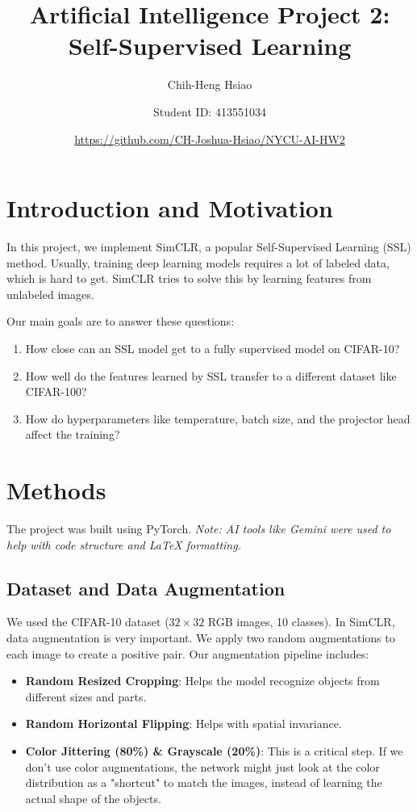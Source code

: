 \documentclass[12pt]{article}
\title{Artificial Intelligence Project 2: Self-Supervised Learning}
\author{Chih-Heng Hsiao \and Student ID: 413551034}
\date{\url{https://github.com/CH-Joshua-Hsiao/NYCU-AI-HW2}}
\begin{document}
\maketitle

\section{Introduction and Motivation}
In this project, we implement SimCLR, a popular Self-Supervised Learning (SSL) method. Usually, training deep learning models requires a lot of labeled data, which is hard to get. SimCLR tries to solve this by learning features from unlabeled images.

Our main goals are to answer these questions:
\begin{enumerate}
    \item How close can an SSL model get to a fully supervised model on CIFAR-10?
    \item How well do the features learned by SSL transfer to a different dataset like CIFAR-100?
    \item How do hyperparameters like temperature, batch size, and the projector head affect the training?
\end{enumerate}

\section{Methods}
The project was built using PyTorch. \textit{Note: AI tools like Gemini were used to help with code structure and LaTeX formatting.}

\subsection{Dataset and Data Augmentation}
We used the CIFAR-10 dataset ($32\times32$ RGB images, 10 classes). In SimCLR, data augmentation is very important. We apply two random augmentations to each image to create a positive pair. Our augmentation pipeline includes:
\begin{itemize}
    \item \textbf{Random Resized Cropping}: Helps the model recognize objects from different sizes and parts.
    \item \textbf{Random Horizontal Flipping}: Helps with spatial invariance.
    \item \textbf{Color Jittering (80\%) \& Grayscale (20\%)}: This is a critical step. If we don't use color augmentations, the network might just look at the color distribution as a "shortcut" to match the images, instead of learning the actual shape of the objects.
\end{itemize}
\end{document}
